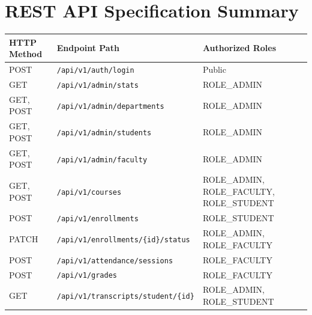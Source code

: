 \documentclass[12pt,a4paper,oneside]{report}
\begin{document}
\chapter{REST API Specification Summary}
\begin{table}[h!]
\centering
\small
\begin{tabular}{lll}
\toprule
\textbf{HTTP Method} & \textbf{Endpoint Path} & \textbf{Authorized Roles} \\
\midrule
POST & \texttt{/api/v1/auth/login} & Public \\
GET & \texttt{/api/v1/admin/stats} & ROLE\_ADMIN \\
GET, POST & \texttt{/api/v1/admin/departments} & ROLE\_ADMIN \\
GET, POST & \texttt{/api/v1/admin/students} & ROLE\_ADMIN \\
GET, POST & \texttt{/api/v1/admin/faculty} & ROLE\_ADMIN \\
GET, POST & \texttt{/api/v1/courses} & ROLE\_ADMIN, ROLE\_FACULTY, ROLE\_STUDENT \\
POST & \texttt{/api/v1/enrollments} & ROLE\_STUDENT \\
PATCH & \texttt{/api/v1/enrollments/\{id\}/status} & ROLE\_ADMIN, ROLE\_FACULTY \\
POST & \texttt{/api/v1/attendance/sessions} & ROLE\_FACULTY \\
POST & \texttt{/api/v1/grades} & ROLE\_FACULTY \\
GET & \texttt{/api/v1/transcripts/student/\{id\}} & ROLE\_ADMIN, ROLE\_STUDENT \\
\bottomrule
\end{tabular}
\end{table}
\end{document}
